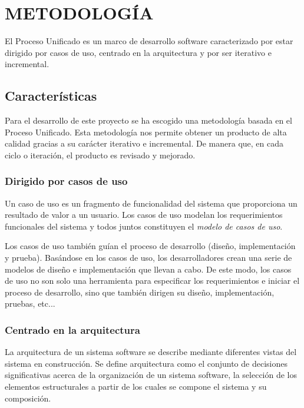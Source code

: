 \chapter[Metodología]{
  \label{chp:metodologia}
  METODOLOGÍA
}
\thispagestyle{numberingStyle}
\pagestyle{numberingStyle}

El Proceso Unificado es un marco de desarrollo software caracterizado por estar dirigido por casos de uso, centrado en la arquitectura y por ser iterativo e incremental.


\section{Características}

Para el desarrollo de este proyecto se ha escogido una metodología basada en el Proceso Unificado. Esta metodología nos permite obtener un producto de alta calidad gracias a su carácter iterativo e incremental. De manera que, en cada ciclo o iteración, el producto es revisado y mejorado.

\subsection{Dirigido por casos de uso}
Un caso de uso es un fragmento de funcionalidad del sistema que proporciona un resultado de valor a un usuario. Los casos de uso modelan los requerimientos funcionales del sistema y todos juntos constituyen el  \textit{modelo de casos de uso}.

Los casos de uso también guían el proceso de desarrollo (diseño, implementación y prueba). Basándose en los casos de uso, los desarrolladores crean una serie de modelos de diseño e implementación que llevan a cabo. De este modo, los casos de uso no son solo una herramienta para especificar los requerimientos e iniciar el proceso de desarrollo, sino que también dirigen su diseño, implementación, pruebas, etc...

\subsection{Centrado en la arquitectura}
La arquitectura de un sistema software se describe mediante diferentes vistas del sistema en construcción. Se define arquitectura como el conjunto de decisiones significativas acerca de la organización de un sistema software, la selección de los elementos estructurales a partir de los cuales se compone el sistema y su composición.

